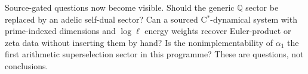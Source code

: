 Source-gated questions now become visible.  Should the generic \(\mathbb Q\)
sector be replaced by an adelic self-dual sector?  Can a sourced
C\(^*\)-dynamical system with prime-indexed dimensions and \(\log\ell\) energy
weights recover Euler-product or zeta data without inserting them by hand?  Is
the nonimplementability of \(\alpha_1\) the first arithmetic superselection
sector in this programme?  These are questions, not conclusions.
